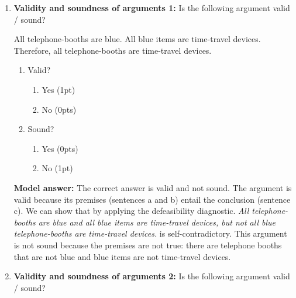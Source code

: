 \documentclass[a4,11pt]{article}
\begin{document}
\begin{enumerate}[leftmargin = 12pt]
{\bf Model answer:} The correct answer is presupposition. First, we apply the defeasibility diagnostic: because {\em The flying saucer the flying saucer has come sometime in the past} is self-contradictory, B is a non-defeasible inference of sentence A. Next, we apply the projection diagnostic. The relevant versions of sentence A are the following: {\em The flying saucer did not come again}, {\em Did the flying saucer come again?} and {\em If the flying saucer came again, Mulder will be happy.}  Because sentence A implies inference B, and the versions of sentence A also imply B, B is not an ordinary entailment but a presupposition.

 
\item {\bf Validity and soundness of arguments 1:} Is the following argument valid / sound?
\begin{exe}
\ex
\begin{xlist}
\ex All telephone-booths are blue.
\ex All blue items are time-travel devices.
\ex Therefore, all telephone-booths are time-travel devices.
\end{xlist}
\end{exe}
 \begin{enumerate}[noitemsep]
    \item Valid? 
    \begin{enumerate}[noitemsep]
   \item Yes (1pt) 
  \item No (0pts)
  \end{enumerate}
    \item Sound?
        \begin{enumerate}[noitemsep]
       \item  Yes (0pts) 
       \item No (1pt)
           \end{enumerate}
\end{enumerate}

 {\bf Model answer:} The correct answer is valid and not sound. The argument is valid because its premises (sentences a and b) entail the conclusion (sentence c). We can show that by applying the defeasibility diagnostic. {\em All telephone-booths are blue and all blue items are time-travel devices, but not all blue telephone-booths are time-travel devices.} is self-contradictory. This argument is not sound because the premises are not true: there are telephone booths that are not blue and blue items are not time-travel devices.

\item {\bf Validity and soundness of arguments 2:} Is the following argument valid / sound?


\end{enumerate}
\end{document}
